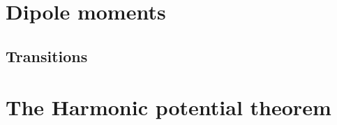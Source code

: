     \section{Dipole moments}
        \subsection{Transitions}

    \section{The Harmonic potential theorem}
